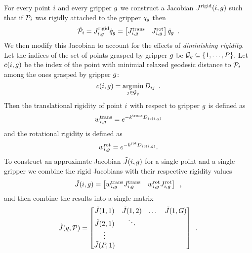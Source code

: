For every point $i$ and every gripper $g$ we construct a Jacobian $J^{\textrm{rigid}}(i, g)$ such that if $\mathcal{P}_i$ was rigidly attached to the gripper $q_g$ then
\begin{equation}
    \dot{\mathcal{P}_i} = J^{\textrm{rigid}}_{i, g} \dot{q}_g = 
    \begin{bmatrix} J^{\textrm{trans}}_{i, g} & J^{\textrm{rot}}_{i, g} \end{bmatrix} \dot{q}_g \enspace .
\end{equation}
We then modify this Jacobian to account for the effects of \textit{diminishing rigidity}. Let the indices of the set of points grasped by gripper $g$ be $\mathcal{G}_g \subseteq \{1, \dots, P \}$. Let $c(i, g)$ be the index of the point with minimial relaxed geodesic distance to $\mathcal{P}_i$ among the ones grasped by gripper $g$:
\begin{equation}
    c(i, g) = \operatorname*{argmin}_{j \in \mathcal{G}_g} D_{i j} \enspace .
\end{equation}
Then the translational rigidity of point $i$ with respect to gripper $g$ is defined as
\begin{equation}
    w^{\textrm{trans}}_{i, g} = e^{-k^{\textrm{trans}} D_{i c(i, g)}}
\end{equation}
and the rotational rigidity is defined as
\begin{equation}
    w^{\textrm{rot}}_{i, g} = e^{-k^{\textrm{rot}} D_{i c(i, g)}}.
\end{equation}
To construct an approximate Jacobian $\tilde {J}(i, g)$ for a single point and a single gripper we combine the rigid Jacobians with their respective rigidity values
\begin{equation}
    \tilde {J}(i, g) = \begin{bmatrix} w^{\textrm{trans}}_{i, g} J^{\textrm{trans}}_{i, g} & w^{\textrm{rot}}_{i, g} J^{\textrm{rot}}_{i, g} \end{bmatrix} \enspace,
\end{equation}
and then combine the results into a single matrix
\begin{equation}
    \tilde {J}(q, \mathcal{P}) = 
    \begin{bmatrix}
        \tilde {J}(1,1) & \tilde {J}(1,2) & \dots & \tilde {J}(1, G) \\
        \tilde {J}(2,1) & \ddots \\
        \vdots \\
        \tilde {J}(P,1)
    \end{bmatrix} \enspace .
\end{equation}

